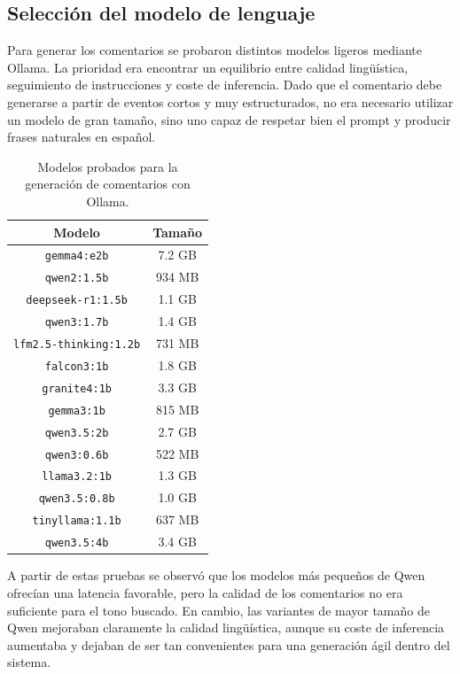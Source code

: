 \subsection{Selección del modelo de lenguaje}

Para generar los comentarios se probaron distintos modelos ligeros mediante Ollama. La prioridad era encontrar un equilibrio entre calidad lingüística, seguimiento de instrucciones y coste de inferencia. Dado que el comentario debe generarse a partir de eventos cortos y muy estructurados, no era necesario utilizar un modelo de gran tamaño, sino uno capaz de respetar bien el prompt y producir frases naturales en español.

\begin{table}[H]
    \centering
    \scriptsize
    \begin{tabular}{c|c}
        \textbf{Modelo} & \textbf{Tamaño} \\
        \hline\hline
        \texttt{gemma4:e2b} & 7.2 GB \\
        \texttt{qwen2:1.5b} & 934 MB \\
        \texttt{deepseek-r1:1.5b} & 1.1 GB \\
        \texttt{qwen3:1.7b} & 1.4 GB \\
        \texttt{lfm2.5-thinking:1.2b} & 731 MB \\
        \texttt{falcon3:1b} & 1.8 GB \\
        \texttt{granite4:1b} & 3.3 GB \\
        \texttt{gemma3:1b} & 815 MB \\
        \texttt{qwen3.5:2b} & 2.7 GB \\
        \texttt{qwen3:0.6b} & 522 MB \\
        \texttt{llama3.2:1b} & 1.3 GB \\
        \texttt{qwen3.5:0.8b} & 1.0 GB \\
        \texttt{tinyllama:1.1b} & 637 MB \\
        \texttt{qwen3.5:4b} & 3.4 GB \\
        \hline
    \end{tabular}
    \caption{Modelos probados para la generación de comentarios con Ollama.}
    \label{tab:modelos_llm_probados}
\end{table}


A partir de estas pruebas se observó que los modelos más pequeños de Qwen ofrecían una latencia favorable, pero la calidad de los comentarios no era suficiente para el tono buscado. En cambio, las variantes de mayor tamaño de Qwen mejoraban claramente la calidad lingüística, aunque su coste de inferencia aumentaba y dejaban de ser tan convenientes para una generación ágil dentro del sistema.

